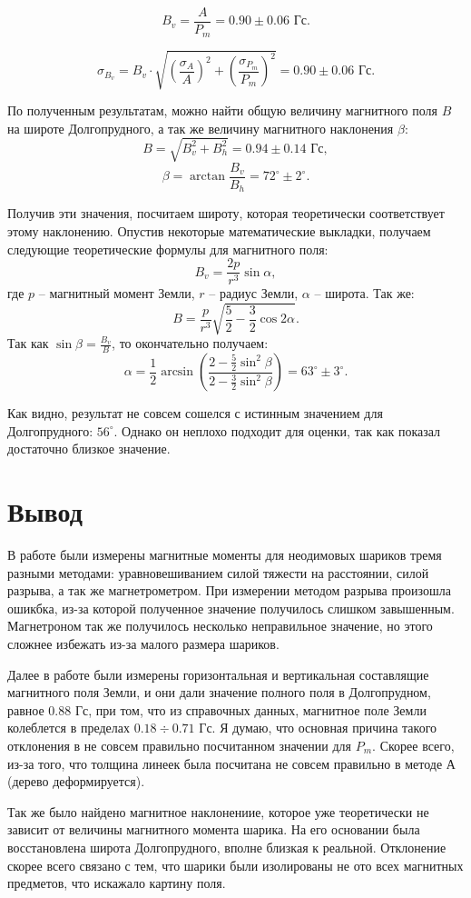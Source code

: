 \documentclass[a4paper, 14pt]{extarticle}%
\begin{document}
\[B_v = \frac{A}{P_m} = 0.90\pm0.06 \text{ Гс}.\]

\[\sigma_{B_v} = B_v\cdot \sqrt{\left(\frac{\sigma_A}{A}\right)^2  +  \left(\frac{\sigma_{P_m}}{P_m}\right)^2} = 0.90\pm0.06 \text{ Гс}.\]

По полученным результатам, можно найти общую величину магнитного поля $B$ на широте Долгопрудного, а так же величину магнитного наклонения $\beta$:
\[B = \sqrt{B_v^2+B_h^2} = 0.94\pm 0.14\text{ Гс},\]
\[\beta = \arctan\frac{B_v}{B_h} = 72^{\circ}\pm2^{\circ}.\]

Получив эти значения, посчитаем широту, которая теоретически соответствует этому наклонению. Опустив некоторые математические выкладки, получаем следующие теоретические формулы для магнитного поля:
\[B_v = \frac{2p}{r^3}\sin\alpha,\]
где $p$ -- магнитный момент Земли, $r$ -- радиус Земли, $\alpha$  -- широта. Так же:
\[B = \frac{p}{r^3}\sqrt{\frac{5}{2} - \frac{3}{2}\cos2\alpha}.\]
Так как
$\sin\beta = \frac{B_v}{B}$, то окончательно получаем:
\[\alpha = \frac{1}{2}\arcsin\left( \dfrac{2 - \frac{5}{2}\sin^2\beta}{2 - \frac{3}{2}\sin^2\beta}\right)  = 63^{\circ}\pm3^{\circ}.\]

Как видно, результат не совсем сошелся с истинным значением для Долгопрудного: $56^{\circ}$. Однако он неплохо подходит для оценки, так как показал достаточно близкое значение. 
\section{Вывод}
В работе были измерены магнитные моменты для неодимовых шариков тремя разными методами: уравновешиванием силой тяжести на расстоянии, силой разрыва, а так же магнетрометром. При измерении методом разрыва произошла ошикбка, из-за которой полученное значение получилось слишком завышенным. Магнетроном так же получилось несколько неправильное значение, но этого сложнее избежать из-за малого размера шариков. 

Далее в работе были измерены горизонтальная и вертикальная составлящие магнитного поля Земли, и они дали значение полного поля в Долгопрудном, равное 0.88 Гс, при том, что из справочных данных, магнитное поле Земли колеблется в пределах $0.18\div0.71$ Гс. Я думаю, что основная причина такого отклонения в не совсем правильно посчитанном значении для $P_m$. Скорее всего, из-за того, что толщина линеек была посчитана не совсем правильно в методе А (дерево деформируется).

Так же было найдено магнитное наклонениие, которое уже теоретически не зависит от величины магнитного момента шарика. На его основании была восстановлена широта Долгопрудного, вполне близкая к реальной. Отклонение скорее всего связано с тем, что шарики были изолированы не ото всех магнитных предметов, что искажало картину поля.
\end{document}
